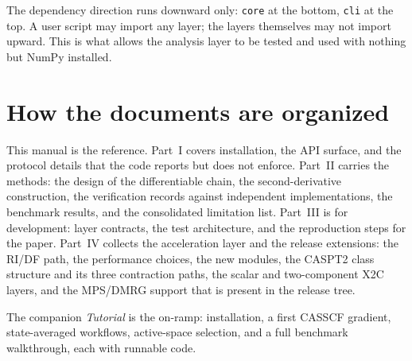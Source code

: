 The dependency direction runs downward only: \texttt{core} at the
bottom, \texttt{cli} at the top.  A user script may import any layer;
the layers themselves may not import upward.  This is what allows the
analysis layer to be tested and used with nothing but NumPy installed.

\section{How the documents are organized}

This manual is the reference.  Part~I covers installation, the API
surface, and the protocol details that the code reports but does not
enforce.  Part~II carries the methods: the design of the differentiable
chain, the second-derivative construction, the verification records
against independent implementations, the benchmark results, and the
consolidated limitation list.  Part~III is for development: layer
contracts, the test architecture, and the reproduction steps for the
paper.  Part~IV collects the acceleration layer and the release
extensions: the RI/DF path, the performance choices, the new modules,
the CASPT2 class structure and its three contraction paths, the scalar
and two-component X2C layers, and the MPS/DMRG support that is present
in the release tree.

The companion \emph{Tutorial} is the on-ramp: installation, a first
CASSCF gradient, state-averaged workflows, active-space selection, and
a full benchmark walkthrough, each with runnable code.
